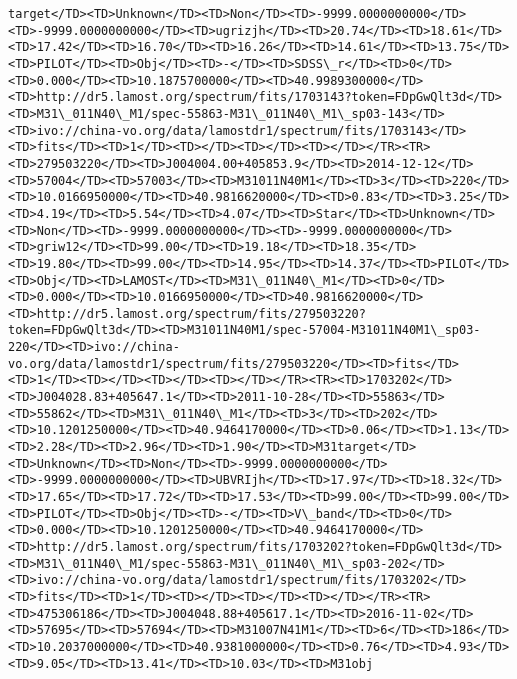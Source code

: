\documentclass[11pt]{article}
\begin{document}
\begin{Verbatim}[commandchars=\\\{\}]
target</TD><TD>Unknown</TD><TD>Non</TD><TD>-9999.0000000000</TD><TD>-9999.0000000000</TD><TD>ugrizjh</TD><TD>20.74</TD><TD>18.61</TD><TD>17.42</TD><TD>16.70</TD><TD>16.26</TD><TD>14.61</TD><TD>13.75</TD><TD>PILOT</TD><TD>Obj</TD><TD>-</TD><TD>SDSS\_r</TD><TD>0</TD><TD>0.000</TD><TD>10.1875700000</TD><TD>40.9989300000</TD><TD>http://dr5.lamost.org/spectrum/fits/1703143?token=FDpGwQlt3d</TD><TD>M31\_011N40\_M1/spec-55863-M31\_011N40\_M1\_sp03-143</TD><TD>ivo://china-vo.org/data/lamostdr1/spectrum/fits/1703143</TD><TD>fits</TD><TD>1</TD><TD></TD><TD></TD><TD></TD></TR><TR><TD>279503220</TD><TD>J004004.00+405853.9</TD><TD>2014-12-12</TD><TD>57004</TD><TD>57003</TD><TD>M31011N40M1</TD><TD>3</TD><TD>220</TD><TD>10.0166950000</TD><TD>40.9816620000</TD><TD>0.83</TD><TD>3.25</TD><TD>4.19</TD><TD>5.54</TD><TD>4.07</TD><TD>Star</TD><TD>Unknown</TD><TD>Non</TD><TD>-9999.0000000000</TD><TD>-9999.0000000000</TD><TD>griw12</TD><TD>99.00</TD><TD>19.18</TD><TD>18.35</TD><TD>19.80</TD><TD>99.00</TD><TD>14.95</TD><TD>14.37</TD><TD>PILOT</TD><TD>Obj</TD><TD>LAMOST</TD><TD>M31\_011N40\_M1</TD><TD>0</TD><TD>0.000</TD><TD>10.0166950000</TD><TD>40.9816620000</TD><TD>http://dr5.lamost.org/spectrum/fits/279503220?token=FDpGwQlt3d</TD><TD>M31011N40M1/spec-57004-M31011N40M1\_sp03-220</TD><TD>ivo://china-vo.org/data/lamostdr1/spectrum/fits/279503220</TD><TD>fits</TD><TD>1</TD><TD></TD><TD></TD><TD></TD></TR><TR><TD>1703202</TD><TD>J004028.83+405647.1</TD><TD>2011-10-28</TD><TD>55863</TD><TD>55862</TD><TD>M31\_011N40\_M1</TD><TD>3</TD><TD>202</TD><TD>10.1201250000</TD><TD>40.9464170000</TD><TD>0.06</TD><TD>1.13</TD><TD>2.28</TD><TD>2.96</TD><TD>1.90</TD><TD>M31target</TD><TD>Unknown</TD><TD>Non</TD><TD>-9999.0000000000</TD><TD>-9999.0000000000</TD><TD>UBVRIjh</TD><TD>17.97</TD><TD>18.32</TD><TD>17.65</TD><TD>17.72</TD><TD>17.53</TD><TD>99.00</TD><TD>99.00</TD><TD>PILOT</TD><TD>Obj</TD><TD>-</TD><TD>V\_band</TD><TD>0</TD><TD>0.000</TD><TD>10.1201250000</TD><TD>40.9464170000</TD><TD>http://dr5.lamost.org/spectrum/fits/1703202?token=FDpGwQlt3d</TD><TD>M31\_011N40\_M1/spec-55863-M31\_011N40\_M1\_sp03-202</TD><TD>ivo://china-vo.org/data/lamostdr1/spectrum/fits/1703202</TD><TD>fits</TD><TD>1</TD><TD></TD><TD></TD><TD></TD></TR><TR><TD>475306186</TD><TD>J004048.88+405617.1</TD><TD>2016-11-02</TD><TD>57695</TD><TD>57694</TD><TD>M31007N41M1</TD><TD>6</TD><TD>186</TD><TD>10.2037000000</TD><TD>40.9381000000</TD><TD>0.76</TD><TD>4.93</TD><TD>9.05</TD><TD>13.41</TD><TD>10.03</TD><TD>M31obj    
\end{Verbatim}
\end{document}
